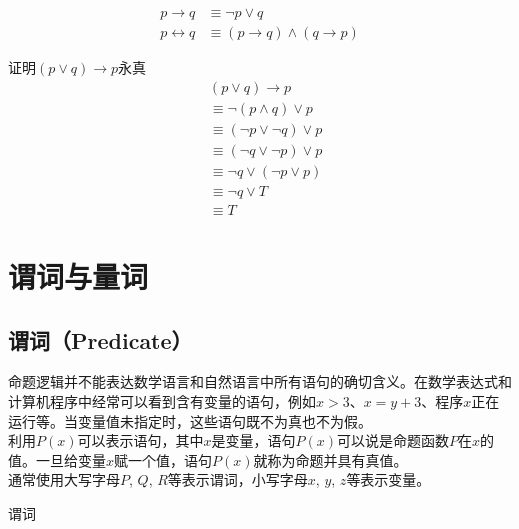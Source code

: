 \begin{tcolorbox}
	\begin{align}
		p \rightarrow q     & \equiv \neg p \vee q                              \\
		p \leftrightarrow q & \equiv (p \rightarrow q) \wedge (q \rightarrow p)
	\end{align}
\end{tcolorbox}

\begin{tcolorbox}
	证明$ (p \vee q) \rightarrow p $永真
	\begin{align*}
		 & (p \vee q) \rightarrow p           \\
		 & \equiv \neg (p \wedge q) \vee p    \\
		 & \equiv (\neg p \vee \neg q) \vee p \\
		 & \equiv (\neg q \vee \neg p) \vee p \\
		 & \equiv \neg q \vee (\neg p \vee p) \\
		 & \equiv \neg q \vee T               \\
		 & \equiv T
	\end{align*}
\end{tcolorbox}

\newpage

\section{谓词与量词}

\subsection{谓词（Predicate）}

命题逻辑并不能表达数学语言和自然语言中所有语句的确切含义。在数学表达式和计算机程序中经常可以看到含有变量的语句，例如$ x > 3 $、$ x = y + 3 $、程序$ x $正在运行等。当变量值未指定时，这些语句既不为真也不为假。\\

利用$ P(x) $可以表示语句，其中$ x $是变量，语句$ P(x) $可以说是命题函数$ P $在$ x $的值。一旦给变量$ x $赋一个值，语句$ P(x) $就称为命题并具有真值。\\

通常使用大写字母$ P $, $ Q $, $ R $等表示谓词，小写字母$ x $, $ y $, $ z $等表示变量。

\begin{tcolorbox}
	谓词
	\begin{table}[H]
		\centering
	\end{table}
\end{tcolorbox}

